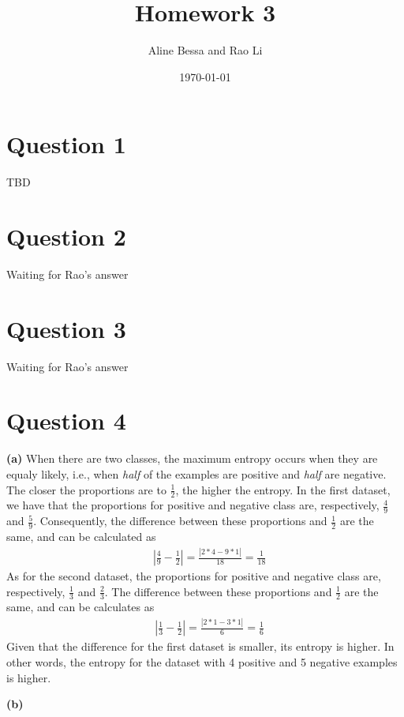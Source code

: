\documentclass[leqno]{article}
\title{Homework 3}
\author{Aline Bessa and Rao Li}
\date\today
\begin{document}
\maketitle %

\section*{Question 1} TBD

\hfill

\section*{Question 2} Waiting for Rao's answer

\hfill


\section*{Question 3} Waiting for Rao's answer 

\hfill

\section*{Question 4} \textbf{(a)} When there are two classes, the maximum entropy occurs when they are equaly likely, i.e., 
when \textit{half} of the examples are positive and \textit{half} are negative. The closer the proportions are to $\frac{1}{2}$, 
the higher the entropy. In the first dataset, we have that the proportions for positive and negative class are, respectively, 
$\frac{4}{9}$ and $\frac{5}{9}$. Consequently, the difference between these proportions and $\frac{1}{2}$ are the same, and can 
be calculated as
\begin{equation*}
\begin{split}
&|\frac{4}{9} - \frac{1}{2}| = \frac{|2*4 - 9*1|}{18} = \frac{1}{18}
\end{split}
\end{equation*}
As for the second dataset, the proportions for positive and negative class are, respectively, $\frac{1}{3}$ and $\frac{2}{3}$. 
The difference between these proportions and $\frac{1}{2}$ are the same, and can be calculates as 
\begin{equation*}
\begin{split}
&|\frac{1}{3} - \frac{1}{2}| = \frac{|2*1 - 3*1|}{6} = \frac{1}{6}
\end{split}
\end{equation*}
Given that the difference for the first dataset is smaller, its entropy is higher. In other words, the entropy for the dataset with 4 positive and 
5 negative examples is higher.

\hfill

\noindent \textbf{(b)} 
\end{document}
